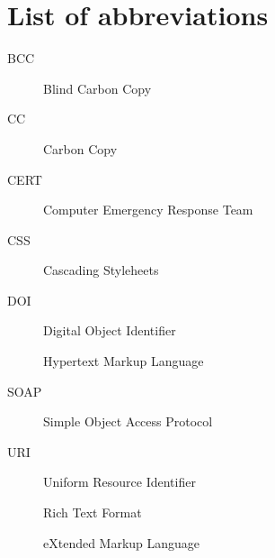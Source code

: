 \chapter*{List of abbreviations}

\begin{multicols}{2}
\raggedright
\begin{description}
\item [BCC] Blind Carbon Copy
\item [CC] Carbon Copy
\item [CERT] Computer Emergency Response Team
\item [CSS] Cascading Styleheets
\item [DOI] Digital Object Identifier
\item [] Hypertext Markup Language
\item [SOAP] Simple Object Access Protocol
\item [URI] Uniform Resource Identifier
\item [] Rich Text Format
\item [] eXtended Markup Language
\end{description}
\end{multicols}

